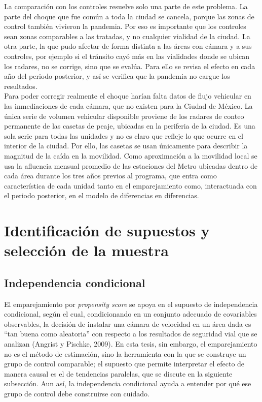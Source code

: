 La comparación con los controles resuelve solo una parte de este problema. La parte del choque que fue común a toda la ciudad se cancela, porque las zonas de control también vivieron la pandemia. Por eso es importante que los controles sean zonas comparables a las tratadas, y no cualquier vialidad de la ciudad. La otra parte, la que pudo afectar de forma distinta a las áreas con cámara y a sus controles, por ejemplo si el tránsito cayó más en las vialidades donde se ubican los radares, no se corrige, sino que se evalúa. Para ello se revisa el efecto en cada año del periodo posterior, y así se verifica que la pandemia no cargue los resultados.\\

Para poder corregir realmente el choque harían falta datos de flujo vehicular en las inmediaciones de cada cámara, que no existen para la Ciudad de México. La única serie de volumen vehicular disponible proviene de los radares de conteo permanente de las casetas de peaje, ubicadas en la periferia de la ciudad. Es una sola serie para todas las unidades y no es claro que refleje lo que ocurre en el interior de la ciudad. Por ello, las casetas se usan únicamente para describir la magnitud de la caída en la movilidad. Como aproximación a la movilidad local se usa la afluencia mensual promedio de las estaciones del Metro ubicadas dentro de cada área durante los tres años previos al programa, que entra como característica de cada unidad tanto en el emparejamiento como, interactuada con el periodo posterior, en el modelo de diferencias en diferencias.\\

\section{Identificación de supuestos y selección de la muestra}
\subsection{Independencia condicional}
\noindent El emparejamiento por \textit{propensity score} se apoya en el supuesto de independencia condicional, según el cual, condicionando en un conjunto adecuado de covariables observables, la decisión de instalar una cámara de velocidad en un área dada es “tan buena como aleatoria” con respecto a los resultados de seguridad vial que se analizan (Angrist y Pischke, 2009). En esta tesis, sin embargo, el emparejamiento no es el método de estimación, sino la herramienta con la que se construye un grupo de control comparable; el supuesto que permite interpretar el efecto de manera causal es el de tendencias paralelas, que se discute en la siguiente subsección. Aun así, la independencia condicional ayuda a entender por qué ese grupo de control debe construirse con cuidado.\\

